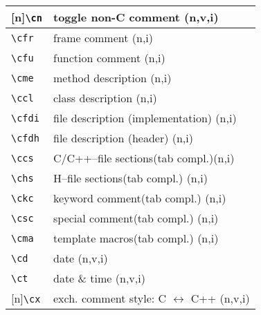 \documentclass[oneside,11pt,landscape,DIV16]{scrartcl}
\newcommand{\Rep}{{\tiny{[n]}}}
\begin{document}
\begin{multicols}{3}
\begin{center}
\begin{tabular}[]{|p{10mm}|p{60mm}|}
\hline \Rep\verb'\cn'  & toggle non-C comment                    \hfill (n,v,i)\\
%
\hline \verb'\cfr' & frame comment                               \hfill (n,i)\\
\hline \verb'\cfu' & function comment                            \hfill (n,i)\\
\hline \verb'\cme' & method description                          \hfill (n,i)\\
\hline \verb'\ccl' & class description                           \hfill (n,i)\\
\hline \verb'\cfdi'& file description (implementation)           \hfill (n,i)\\
\hline \verb'\cfdh'& file description (header)                   \hfill (n,i)\\
%
\hline \verb'\ccs'& C/C++--file sections\hspace{3mm}\footnotesize{(tab compl.)}\hfill \normalsize{(n,i)}\\
\hline \verb'\chs'& H--file sections\hspace{10mm}\footnotesize{(tab compl.)}   \hfill \normalsize{(n,i)}\\
\hline \verb'\ckc'& keyword comment\hspace{5mm}\footnotesize{(tab compl.)}     \hfill \normalsize{(n,i)}\\
\hline \verb'\csc'& special comment\hspace{7,5mm}\footnotesize{(tab compl.)}   \hfill \normalsize{(n,i)}\\
\hline \verb'\cma'& template macros\hspace{7,5mm}\footnotesize{(tab compl.)}   \hfill \normalsize{(n,i)}\\
%
\hline \verb'\cd' & date                                                       \hfill (n,v,i)\\
\hline \verb'\ct' & date \& time                                               \hfill (n,v,i)\\
\hline \Rep\verb'\cx' & exch. comment style: C $\leftrightarrow$ C++           \hfill (n,v,i)\\
\hline 
\end{tabular}\\
%
%
\begin{tabular}[]{|p{15mm}|p{55mm}|}

\end{tabular}
\end{center}
\end{multicols}
\end{document}
